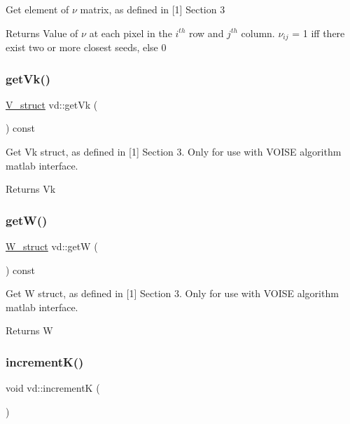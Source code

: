 Get element of $\nu$ matrix, as defined in \mbox{[}1\mbox{]} Section 3 \begin{DoxyReturn}{Returns}
Value of $\nu$ at each pixel in the $ i^{th} $ row and $ j^{th} $ column. $\nu_{ij}$ = 1 iff there exist two or more closest seeds, else 0 
\end{DoxyReturn}
\mbox{\label{classvd_a090bebdbbff36888934c870daf3dcb36}} 
\subsubsection{\texorpdfstring{get\+Vk()}{getVk()}}
{\footnotesize\ttfamily \mbox{\hyperlink{structV__struct}{V\+\_\+struct}} vd\+::get\+Vk (\begin{DoxyParamCaption}{ }\end{DoxyParamCaption}) const}

Get Vk struct, as defined in \mbox{[}1\mbox{]} Section 3. Only for use with V\+O\+I\+SE algorithm matlab interface. \begin{DoxyReturn}{Returns}
Vk 
\end{DoxyReturn}
\mbox{\label{classvd_ab4d0d9ea76cedf1a6825b62c9ec2d118}} 
\subsubsection{\texorpdfstring{get\+W()}{getW()}}
{\footnotesize\ttfamily \mbox{\hyperlink{structW__struct}{W\+\_\+struct}} vd\+::getW (\begin{DoxyParamCaption}{ }\end{DoxyParamCaption}) const}

Get W struct, as defined in \mbox{[}1\mbox{]} Section 3. Only for use with V\+O\+I\+SE algorithm matlab interface. \begin{DoxyReturn}{Returns}
W 
\end{DoxyReturn}
\mbox{\label{classvd_a59c1f5756af7de9cc7a0089221cbd5b7}} 
\subsubsection{\texorpdfstring{increment\+K()}{incrementK()}}
{\footnotesize\ttfamily void vd\+::incrementK (\begin{DoxyParamCaption}{ }\end{DoxyParamCaption})}

